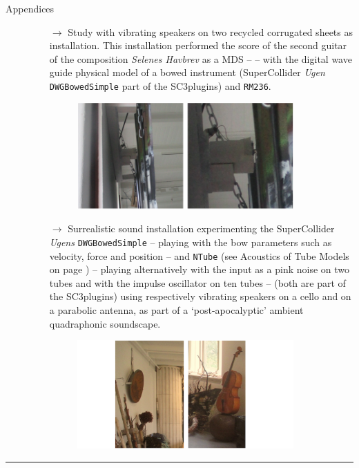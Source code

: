 \begin{description}
\item[Appendices] \hfill 
\begin{itemize}
\item[$\rightarrow$] Study with vibrating speakers on two recycled corrugated sheets as installation. This installation performed the score of the second guitar of the composition \textsl{Selenes Havbrev} as a MDS -- \textsl{} -- with the digital wave guide physical model of a bowed instrument (SuperCollider \textsl{Ugen} \texttt{DWGBowedSimple} part of the SC3plugins) and \texttt{RM236}.\\
\begin{figure}[H]
\hfill \includegraphics[width=0.87\textwidth]{mp/img/vs1a}
\end{figure}

\item[$\rightarrow$] Surrealistic sound installation experimenting the SuperCollider \textsl{Ugens} \texttt{DWGBowedSimple} -- playing with the bow parameters such as velocity, force and position --  and \texttt{NTube} (see Acoustics of Tube Models on page \pageref{atm}) -- playing alternatively with the input as a pink noise on two tubes and with the impulse oscillator on ten tubes -- (both are part of the SC3plugins) using respectively vibrating speakers on a cello and on a parabolic antenna, as part of a `post-apocalyptic' ambient quadraphonic soundscape.\\
\begin{figure}[H]
\hfill \includegraphics[width=0.87\textwidth]{mp/img/asc}
\end{figure}

\end{itemize}
\end{description}

\bigskip

\begin{center}\rule{0.5\linewidth}{0.5pt}\end{center}

\bigskip

